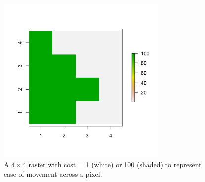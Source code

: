\documentclass[12pt]{article}
\begin{document}
\begin{figure}
\begin{center}
\includegraphics[height=3.25in,width=3.25in]{figs/raster_2values}
\end{center}
\caption{A $4 \times 4$ raster with cost = 1 (white) or 100 (shaded) to represent ease of movement across a pixel.}
\label{ecoldist.fig.raster}
\end{figure}


\newpage
\end{document}
